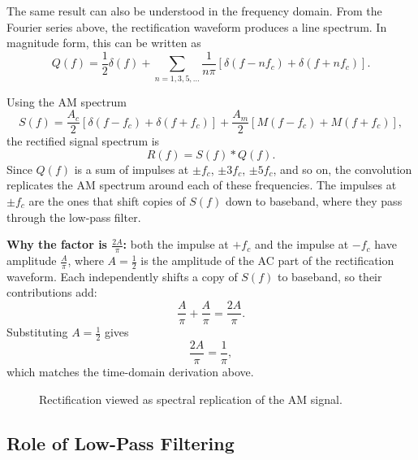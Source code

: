 \begin{tcolorbox}[breakable, colback=purple!5!white,
colframe=purple!60!black,
title={\textbf{Intuition: Spectral Interpretation of Envelope Detection}}]
The same result can also be understood in the frequency domain. From the Fourier
series above, the rectification waveform produces a line spectrum. In magnitude
form, this can be written as
\begin{equation}
Q(f)=\frac{1}{2}\delta(f)
+\sum_{n=1,3,5,\ldots}\frac{1}{n\pi}
\left[\delta(f-nf_c)+\delta(f+nf_c)\right].
\end{equation}

Using the AM spectrum
\begin{equation}
S(f)=\frac{A_c}{2}\left[\delta(f-f_c)+\delta(f+f_c)\right]
+\frac{A_m}{2}\left[M(f-f_c)+M(f+f_c)\right],
\end{equation}
the rectified signal spectrum is
\begin{equation}
R(f)=S(f) * Q(f).
\end{equation}
Since $Q(f)$ is a sum of impulses at $\pm f_c$, $\pm 3f_c$, $\pm 5f_c$, and so
on, the convolution replicates the AM spectrum around each of these frequencies.
The impulses at $\pm f_c$ are the ones that shift copies of $S(f)$ down to
baseband, where they pass through the low-pass filter.
\end{tcolorbox}

\textbf{Why the factor is $\tfrac{2A}{\pi}$:} both the impulse at $+f_c$ and the
impulse at $-f_c$ have amplitude $\tfrac{A}{\pi}$, where $A=\tfrac{1}{2}$ is the
amplitude of the AC part of the rectification waveform. Each independently
shifts a copy of $S(f)$ to baseband, so their contributions add:
\begin{equation}
\frac{A}{\pi}+\frac{A}{\pi}=\frac{2A}{\pi}.
\end{equation}
Substituting $A=\tfrac{1}{2}$ gives
\begin{equation}
\frac{2A}{\pi}=\frac{1}{\pi},
\end{equation}
which matches the time-domain derivation above.

\begin{figure}[H]
\centering
{}
\caption{Rectification viewed as spectral replication of the AM signal.}
\label{fig:lab2_rectifier_convolution}
\end{figure}

\subsection{Role of Low-Pass Filtering}

